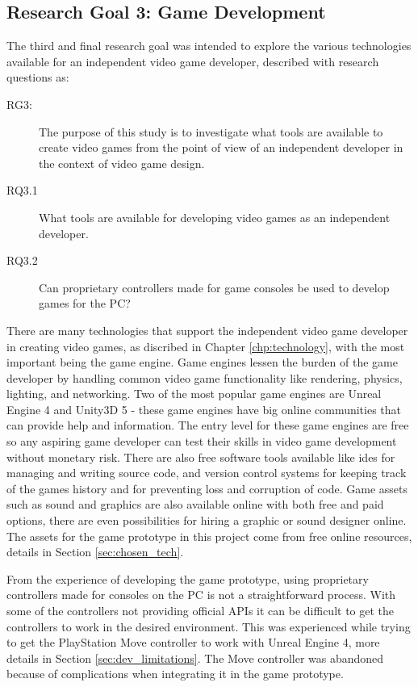 \subsection{Research Goal 3: Game Development}
The third and final research goal was intended to explore the various technologies available for an independent video game developer, described with research questions as:
\begin{description}
	\item[RG3:] The purpose of this study is to investigate what tools are available to create video games from the point of view of an independent developer in the context of video game design. 
	\item[RQ3.1] What tools are available for developing video games as an independent developer.
	\item[RQ3.2] Can proprietary controllers made for game consoles be used to develop games for the PC?
\end{description}
There are many technologies that support the independent video game developer in creating video games, as discribed in Chapter \ref{chp:technology}, with the most important being the game engine. Game engines lessen the burden of the game developer by handling common video game functionality like rendering, physics, lighting, and networking. Two of the most popular game engines are Unreal Engine 4 and Unity3D 5 - these game engines have big online communities that can provide help and information. The entry level for these game engines are free so any aspiring game developer can test their skills in video game development without monetary risk. There are also free software tools available like \gls{ide}s for managing and writing source code, and version control systems for keeping track of the games history and for preventing loss and corruption of code. Game assets such as sound and graphics are also available online with both free and paid options, there are even possibilities for hiring a graphic or sound designer online. The assets for the game prototype in this project come from free online resources, details in Section \ref{sec:chosen_tech}.

From the experience of developing the game prototype, using proprietary controllers made for consoles on the PC is not a straightforward process. With some of the controllers not providing official APIs it can be difficult to get the controllers to work in the desired environment. This was experienced while trying to get the PlayStation Move controller to work with Unreal Engine 4, more details in Section \ref{sec:dev_limitations}. The Move controller was abandoned because of complications when integrating it in the game prototype.
	



